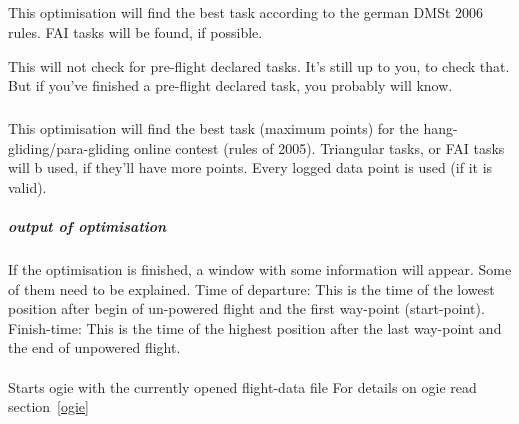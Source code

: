 \subparagraph{
}
This optimisation will find the best task according to the german DMSt 2006 rules. FAI tasks will be found, if possible.

This will not check for pre-flight declared tasks. It's still up to you, to check that. But if you've finished a pre-flight declared task, you probably will know.


\subparagraph{
}
This optimisation will find the best task (maximum points)  for the hang-gliding/para-gliding online contest (rules of 2005). Triangular
tasks, or FAI tasks will b used, if they'll have more points. Every logged data point is used (if it is valid).


\subparagraph{output of optimisation} If the optimisation is finished, a window with some information will appear.
Some of them need to be explained. Time of departure: This is the time of the lowest position after begin of un-powered flight and the first way-point (start-point). Finish-time: This is the time of the highest position after the last way-point and the end of unpowered flight.


\paragraph{
}
Starts ogie with the currently opened flight-data file
For details on ogie read section~\ref{ogie}



